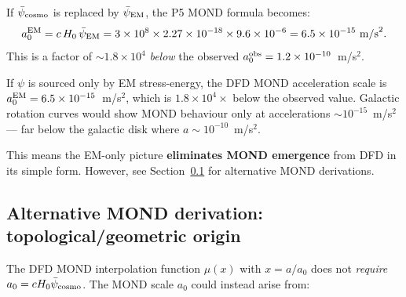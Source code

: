 \documentclass[11pt]{article}
\newcommand{\ee}[1]{\times 10^{#1}}
\newcommand{\psicosmo}{\bar{\psi}_{\rm cosmo}}
\newcommand{\psiEM}{\bar{\psi}_{\rm EM}}
\newcommand{\Hzero}{H_0}
\newcommand{\mufd}{\mu}
\begin{document}
If $\psicosmo$ is replaced by $\psiEM$, the P5 MOND formula becomes:
\begin{equation}\label{eq:a0-EM}
  a_0^{\rm EM} = c\,\Hzero\,\psiEM = 3\ee{8}\times 2.27\ee{-18}\times 9.6\ee{-6}
  = 6.5\ee{-15}~\text{m/s}^2.
\end{equation}
This is a factor of $\sim 1.8\ee{4}$ \emph{below} the observed
$a_0^{\rm obs} = 1.2\ee{-10}$~m/s$^2$.

\begin{tcolorbox}[colback=red!5!white, colframe=red!60!black,
  title=\textbf{NEW TENSION T6: MOND Scale Suppressed by $1.8\times10^4$ Under EM-Only Sourcing}]
If $\psi$ is sourced only by EM stress-energy, the DFD MOND acceleration
scale is $a_0^{\rm EM} = 6.5\ee{-15}$~m/s$^2$, which is $1.8\ee{4}\times$
below the observed value. Galactic rotation curves would show MOND behaviour
only at accelerations $\sim 10^{-15}$~m/s$^2$ --- far below the galactic
disk where $a \sim 10^{-10}$~m/s$^2$.

This means the EM-only picture \textbf{eliminates MOND emergence} from DFD
in its simple form. However, see Section~\ref{sec:MOND-alternative} for
alternative MOND derivations.
\end{tcolorbox}

\subsection{Alternative MOND derivation: topological/geometric origin}
\label{sec:MOND-alternative}

The DFD MOND interpolation function $\mufd(x)$ with $x = a/a_0$ does not
\emph{require} $a_0 = c\Hzero\psicosmo$. The MOND scale $a_0$ could
instead arise from:
\end{document}

